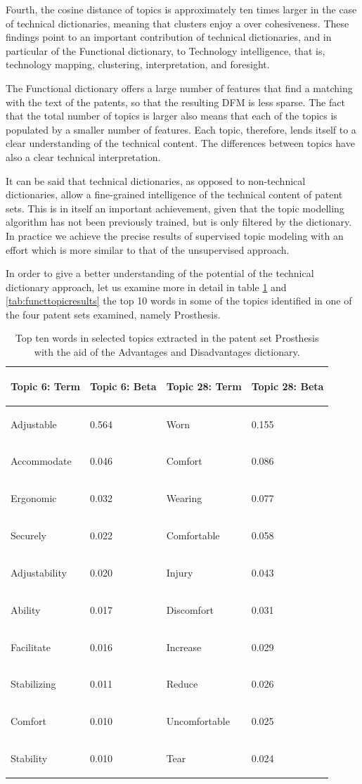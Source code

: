 \documentclass[b5paper,]{book}
\theoremstyle{definition}
\theoremstyle{definition}
\theoremstyle{definition}
\theoremstyle{remark}
\begin{document}
Fourth, the cosine distance of topics is approximately ten times larger
in the case of technical dictionaries, meaning that clusters enjoy a
over cohesiveness. These findings point to an important contribution of
technical dictionaries, and in particular of the Functional dictionary,
to Technology intelligence, that is, technology mapping, clustering,
interpretation, and foresight.

The Functional dictionary offers a large number of features that find a
matching with the text of the patents, so that the resulting DFM is less
sparse. The fact that the total number of topics is larger also means
that each of the topics is populated by a smaller number of features.
Each topic, therefore, lends itself to a clear understanding of the
technical content. The differences between topics have also a clear
technical interpretation.

It can be said that technical dictionaries, as opposed to non-technical
dictionaries, allow a fine-grained intelligence of the technical content
of patent sets. This is in itself an important achievement, given that
the topic modelling algorithm has not been previously trained, but is
only filtered by the dictionary. In practice we achieve the precise
results of supervised topic modeling with an effort which is more
similar to that of the unsupervised approach.

In order to give a better understanding of the potential of the
technical dictionary approach, let us examine more in detail in table
\ref{tab:advtopicresults} and \ref{tab:functtopicresults} the top 10
words in some of the topics identified in one of the four patent sets
examined, namely Prosthesis.

\begin{table}

\caption{\label{tab:advtopicresults}Top ten words in selected topics extracted in the patent set Prosthesis with the aid of the Advantages and Disadvantages dictionary.}
\centering
\begin{tabular}[t]{>{\em\raggedright\arraybackslash}p{10em}l>{\em\raggedright\arraybackslash}p{10em}l}
\toprule
Topic 6: Term & Topic 6: Beta & Topic 28: Term & Topic 28: Beta\\
\midrule
Adjustable & 0.564 & Worn & 0.155\\
Accommodate & 0.046 & Comfort & 0.086\\
Ergonomic & 0.032 & Wearing & 0.077\\
Securely & 0.022 & Comfortable & 0.058\\
Adjustability & 0.020 & Injury & 0.043\\
\addlinespace
Ability & 0.017 & Discomfort & 0.031\\
Facilitate & 0.016 & Increase & 0.029\\
Stabilizing & 0.011 & Reduce & 0.026\\
Comfort & 0.010 & Uncomfortable & 0.025\\
Stability & 0.010 & Tear & 0.024\\
\bottomrule
\end{tabular}
\end{table}
\end{document}
